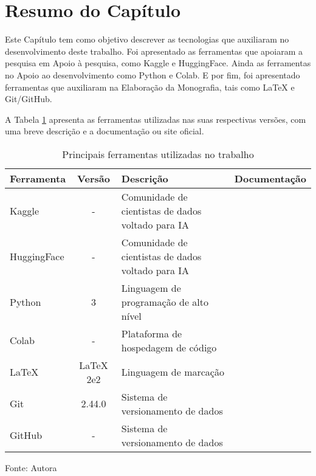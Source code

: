 \section{Resumo do Capítulo}\label{sec:resumosuptec}
Este Capítulo tem como objetivo descrever as tecnologias que auxiliaram no desenvolvimento deste trabalho. Foi apresentado
as ferramentas que apoiaram a pesquisa em Apoio à pesquisa, como Kaggle e HuggingFace. Ainda as ferramentas no Apoio ao
desenvolvimento como Python e Colab. E por fim, foi apresentado ferramentas que auxiliaram na Elaboração da Monografia, tais
como LaTeX e Git/GitHub.

A Tabela \hyperref[tab:1]{1} apresenta as ferramentas utilizadas nas suas respectivas versões, com uma breve descrição e a documentação ou site 
oficial.

\begin{table}[htbp]
    \centering
    \begin{threeparttable}
        \caption{Principais ferramentas utilizadas no trabalho}
        \label{tab:1}
        \begin{tabular}{>{\centering\arraybackslash}m{3cm} c m{5cm} c}
        \toprule 
        Ferramenta & Versão & Descrição & Documentação \\
        \midrule
        Kaggle & - & Comunidade de cientistas de dados voltado para IA & \cite{kagglesite} \\
        \hline 
        HuggingFace & - & Comunidade de cientistas de dados voltado para IA & \cite{huggingsite} \\
        \hline 
        Python & 3 & Linguagem de programação de alto nível & \cite{pythonsite} \\
        \hline 
        Colab & - & Plataforma de hospedagem de código & \cite{colabsite} \\
        \hline 
        LaTeX & LaTeX 2e2 & Linguagem de marcação & \cite{latexsite} \\
        \hline 
        Git & 2.44.0 & Sistema de versionamento de dados & \cite{gitsite} \\
        \hline 
        GitHub & - & Sistema de versionamento de dados & \cite{githubsite} \\
        \bottomrule 
        \end{tabular}
        \begin{tablenotes}
            \small
            \centering
            \item Fonte: Autora
        \end{tablenotes}
    \end{threeparttable}
\end{table}
